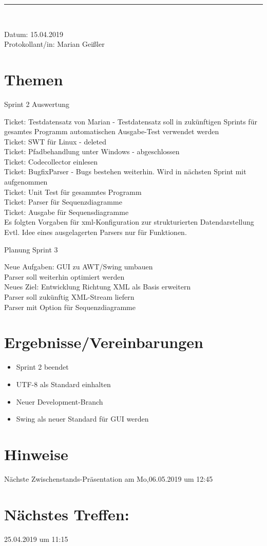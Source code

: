 \begin{center}
\vspace{0.5pt}\nointerlineskip\rule{\textwidth}{0.2pt}\\ 
\vspace{0.5pt}\nointerlineskip
\end{center} 
\large Datum: 15.04.2019\vspace{3pt}\\\large Protokollant/in: Marian Geißler
\section{Themen}
\begin{LARGE}
Sprint 2 Auswertung\\
\end{LARGE}
Ticket: Testdatensatz von Marian - Testdatensatz soll in zukünftigen Sprints für gesamtes Programm automatischen Ausgabe-Test verwendet werden\\
Ticket: SWT für Linux - deleted\\
Ticket: Pfadbehandlung unter Windows - abgeschlossen\\
Ticket: Codecollector einlesen  \\
Ticket: BugfixParser - Bugs bestehen weiterhin. Wird in nächsten Sprint mit aufgenommen\\
Ticket: Unit Test für gesammtes Programm\\
Ticket: Parser für Sequenzdiagramme\\
Ticket: Ausgabe für Sequensdiagramme\\
Es folgten Vorgaben für xml-Konfiguration zur strukturierten Datendarstellung\\
Evtl. Idee eines ausgelagerten Parsers nur für Funktionen.\\
\begin{LARGE} 
Planung Sprint 3\\
\end{LARGE}
Neue Aufgaben: GUI zu AWT/Swing umbauen\\
Parser soll weiterhin optimiert werden\\
Neues Ziel: Entwicklung Richtung XML als Basis erweitern\\
Parser soll zukünftig XML-Stream liefern\\
Parser mit Option für Sequenzdiagramme\\
\section{Ergebnisse/Vereinbarungen}
\begin{itemize}
\item Sprint 2 beendet\\
\item UTF-8 als Standard einhalten\\
\item Neuer Development-Branch \\
\item Swing als neuer Standard für GUI werden\\
\end{itemize}
\section{Hinweise}
Nächste Zwischenstands-Präsentation am Mo,06.05.2019 um 12:45
\section*{Nächstes Treffen:}
25.04.2019 um 11:15